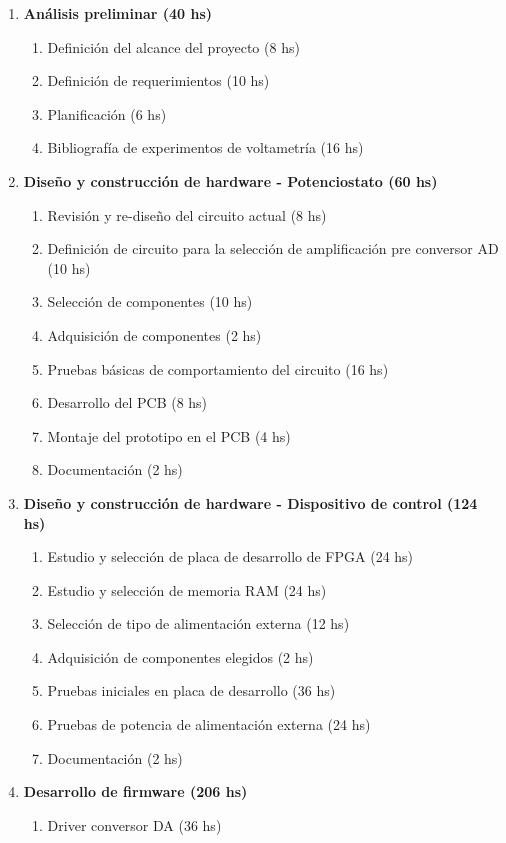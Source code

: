 \documentclass[11pt]{charter}
\begin{document}
\begin{enumerate}
\item \textbf{Análisis preliminar (40 hs)} 
	\begin{enumerate}
		\item Definición del alcance del proyecto (8 hs)
		\item Definición de requerimientos (10 hs)
		\item Planificación (6 hs)
		\item Bibliografía de experimentos de voltametría (16 hs)
	\end{enumerate}
\item \textbf{Diseño y construcción de hardware - Potenciostato (60 hs)}
	\begin{enumerate}
		\item Revisión y re-diseño del circuito actual (8 hs)
		\item Definición de circuito para la selección de amplificación pre conversor AD (10 hs)
		\item Selección de componentes (10 hs)
		\item Adquisición de componentes (2 hs)
		\item Pruebas básicas de comportamiento del circuito (16 hs)
		\item Desarrollo del PCB (8 hs)
		\item Montaje del prototipo en el PCB (4 hs)
		\item Documentación (2 hs)
	\end{enumerate}
\item \textbf{Diseño y construcción de hardware - Dispositivo de control (124 hs)}
	\begin{enumerate}
		\item Estudio y selección de placa de desarrollo de FPGA (24 hs)
		\item Estudio y selección de memoria RAM (24 hs)
		\item Selección de tipo de alimentación externa (12 hs)
		\item Adquisición de componentes elegidos (2 hs)
		\item Pruebas iniciales en placa de desarrollo (36 hs)
		\item Pruebas de potencia de alimentación externa (24 hs)
		\item Documentación (2 hs)
	\end{enumerate}
\item \textbf{Desarrollo de firmware (206 hs)}
	\begin{enumerate}
		\item Driver conversor DA (36 hs)

\end{enumerate}
\end{enumerate}
\end{document}
